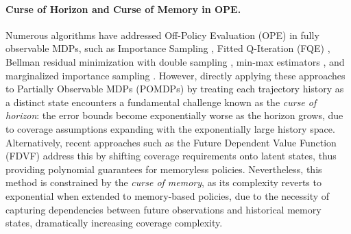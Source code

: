 \documentclass[twoside]{article}
\begin{document}
\paragraph{Curse of Horizon and Curse of Memory in OPE.}
Numerous algorithms have addressed Off-Policy Evaluation (OPE) in fully observable MDPs, such as Importance Sampling \cite{precup2000eligibility, jiang2016doubly, jiang2019entropy, hu2023off}, Fitted Q-Iteration (FQE) \cite{article-1,article-2,pmlr-v97-le19a}, Bellman residual minimization with double sampling \cite{BAIRD199530}, min-max estimators \cite{inproceedings-3,pmlr-v97-chen19e,NEURIPS2019_48e59000,unknown-4,uehara2021finite,NEURIPS2022_14ecbfb2}, and marginalized importance sampling \cite{pmlr-v119-uehara20a}. However, directly applying these approaches to Partially Observable MDPs (POMDPs) by treating each trajectory history as a distinct state encounters a fundamental challenge known as the \textit{curse of horizon}: the error bounds become exponentially worse as the horizon grows, due to coverage assumptions expanding with the exponentially large history space. Alternatively, recent approaches such as the Future Dependent Value Function (FDVF) \cite{NEURIPS2023_3380e811, zhang2024cursesfuturehistoryfuturedependent} address this by shifting coverage requirements onto latent states, thus providing polynomial guarantees for memoryless policies. Nevertheless, this method is constrained by the \textit{curse of memory}, as its complexity reverts to exponential when extended to memory-based policies, due to the necessity of capturing dependencies between future observations and historical memory states, dramatically increasing coverage complexity.
\end{document}
